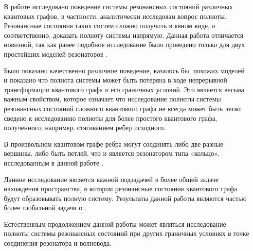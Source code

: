 \startconclusionpage

В работе исследовано поведение системы резонансных состояний различных квантовых графов, в частности, аналитически исследован вопрос полноты. Резонансные состояния таких систем сложно получить в явном виде, и соответственно, доказать полноту системы напрямую. Данная работа отличается новизной, так как ранее подобное исследование было проведено только для двух простейших моделей резонаторов .

Было показано качественно различное поведение, казалось бы, похожих моделей и показано что полнота системы может быть потеряна в ходе непрерывной трансформации квантового графа и его граничных условий. Это является весьма важным свойством, которое означает что исследование полноты системы резонансных состояний сложного квантового графа не всегда может быть легко сведено к исследованию полноты для более простого квантового графа, полученного, например, стягиванием ребер исходного. 

В произвольном квантовом графе ребра могут соединять либо две разные вершины, либо быть петлей, что и является резонатором типа «кольцо», исследованным в данной работе . 

Данное исследование является важной подзадачей в более общей задаче нахождения пространства, в котором резонансные состояния квантового графа будут образовывать полную систему. Результаты данной работы являются частью более глобальной задачи о .

Естественным продолжением данной работы может являться исследование полноты системы резонансных состояний при других граничных условиях в точке соединения резонатора и волновода.